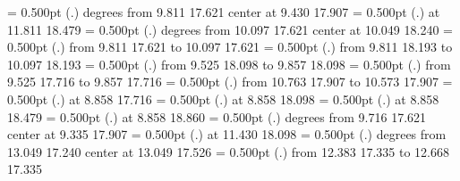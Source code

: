 {{}%
%
%
\linethickness= 0.500pt
\setplotsymbol ({\thinlinefont .})
{\color[rgb]{0,0,0} degrees from  9.811 17.621 center at  9.430 17.907
}%
%
%
\linethickness= 0.500pt
\setplotsymbol ({\thinlinefont .})
{\color[rgb]{0,0,0} at 11.811 18.479
}%
%
%
\linethickness= 0.500pt
\setplotsymbol ({\thinlinefont .})
{\color[rgb]{0,0,0} degrees from 10.097 17.621 center at 10.049 18.240
}%
%
%
\linethickness= 0.500pt
\setplotsymbol ({\thinlinefont .})
{\color[rgb]{0,0,0}\putrule from  9.811 17.621 to 10.097 17.621
}%
%
%
\linethickness= 0.500pt
\setplotsymbol ({\thinlinefont .})
{\color[rgb]{0,0,0}\putrule from  9.811 18.193 to 10.097 18.193
}%
%
%
\linethickness= 0.500pt
\setplotsymbol ({\thinlinefont .})
{\color[rgb]{0,0,0}\putrule from  9.525 18.098 to  9.857 18.098
}%
%
%
\linethickness= 0.500pt
\setplotsymbol ({\thinlinefont .})
{\color[rgb]{0,0,0}\putrule from  9.525 17.716 to  9.857 17.716
}%
%
%
\linethickness= 0.500pt
\setplotsymbol ({\thinlinefont .})
{\color[rgb]{0,0,0}\putrule from 10.763 17.907 to 10.573 17.907
}%
%
%
\linethickness= 0.500pt
\setplotsymbol ({\thinlinefont .})
{\color[rgb]{0,0,0} at  8.858 17.716
}%
%
%
\linethickness= 0.500pt
\setplotsymbol ({\thinlinefont .})
{\color[rgb]{0,0,0} at  8.858 18.098
}%
%
%
\linethickness= 0.500pt
\setplotsymbol ({\thinlinefont .})
{\color[rgb]{0,0,0} at  8.858 18.479
}%
%
%
\linethickness= 0.500pt
\setplotsymbol ({\thinlinefont .})
{\color[rgb]{0,0,0} at  8.858 18.860
}%
%
%
\linethickness= 0.500pt
\setplotsymbol ({\thinlinefont .})
{\color[rgb]{0,0,0} degrees from  9.716 17.621 center at  9.335 17.907
}%
%
%
\linethickness= 0.500pt
\setplotsymbol ({\thinlinefont .})
{\color[rgb]{0,0,0} at 11.430 18.098
}%
%
%
\linethickness= 0.500pt
\setplotsymbol ({\thinlinefont .})
{\color[rgb]{0,0,0} degrees from 13.049 17.240 center at 13.049 17.526
}%
%
%
\linethickness= 0.500pt
\setplotsymbol ({\thinlinefont .})
{\color[rgb]{0,0,0}\putrule from 12.383 17.335 to 12.668 17.335
}%
%
}

